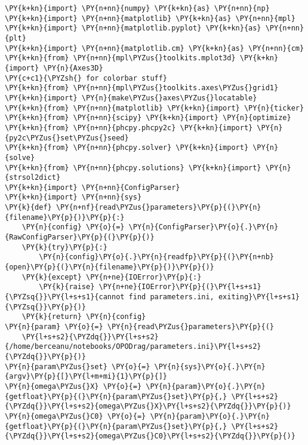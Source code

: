 
\begin{Verbatim}[commandchars=\\\{\}]
\PY{k+kn}{import} \PY{n+nn}{numpy} \PY{k+kn}{as} \PY{n+nn}{np}
\PY{k+kn}{import} \PY{n+nn}{matplotlib} \PY{k+kn}{as} \PY{n+nn}{mpl}
\PY{k+kn}{import} \PY{n+nn}{matplotlib.pyplot} \PY{k+kn}{as} \PY{n+nn}{plt}
\PY{k+kn}{import} \PY{n+nn}{matplotlib.cm} \PY{k+kn}{as} \PY{n+nn}{cm}
\PY{k+kn}{from} \PY{n+nn}{mpl\PYZus{}toolkits.mplot3d} \PY{k+kn}{import} \PY{n}{Axes3D}
\PY{c+c1}{\PYZsh{} for colorbar stuff}
\PY{k+kn}{from} \PY{n+nn}{mpl\PYZus{}toolkits.axes\PYZus{}grid1} \PY{k+kn}{import} \PY{n}{make\PYZus{}axes\PYZus{}locatable}
\PY{k+kn}{from} \PY{n+nn}{matplotlib} \PY{k+kn}{import} \PY{n}{ticker}
\PY{k+kn}{from} \PY{n+nn}{scipy} \PY{k+kn}{import} \PY{n}{optimize}
\PY{k+kn}{from} \PY{n+nn}{phcpy.phcpy2c} \PY{k+kn}{import} \PY{n}{py2c\PYZus{}set\PYZus{}seed}
\PY{k+kn}{from} \PY{n+nn}{phcpy.solver} \PY{k+kn}{import} \PY{n}{solve}
\PY{k+kn}{from} \PY{n+nn}{phcpy.solutions} \PY{k+kn}{import} \PY{n}{strsol2dict}
\PY{k+kn}{import} \PY{n+nn}{ConfigParser}
\PY{k+kn}{import} \PY{n+nn}{sys}
\PY{k}{def} \PY{n+nf}{read\PYZus{}parameters}\PY{p}{(}\PY{n}{filename}\PY{p}{)}\PY{p}{:}
    \PY{n}{config} \PY{o}{=} \PY{n}{ConfigParser}\PY{o}{.}\PY{n}{RawConfigParser}\PY{p}{(}\PY{p}{)}
    \PY{k}{try}\PY{p}{:}
        \PY{n}{config}\PY{o}{.}\PY{n}{readfp}\PY{p}{(}\PY{n+nb}{open}\PY{p}{(}\PY{n}{filename}\PY{p}{)}\PY{p}{)}
    \PY{k}{except} \PY{n+ne}{IOError}\PY{p}{:}
        \PY{k}{raise} \PY{n+ne}{IOError}\PY{p}{(}\PY{l+s+s1}{\PYZsq{}}\PY{l+s+s1}{cannot find parameters.ini, exiting}\PY{l+s+s1}{\PYZsq{}}\PY{p}{)}
    \PY{k}{return} \PY{n}{config}
\PY{n}{param} \PY{o}{=} \PY{n}{read\PYZus{}parameters}\PY{p}{(}
    \PY{l+s+s2}{\PYZdq{}}\PY{l+s+s2}{/home/berceanu/notebooks/OPODrag/parameters.ini}\PY{l+s+s2}{\PYZdq{}}\PY{p}{)}
\PY{n}{param\PYZus{}set} \PY{o}{=} \PY{n}{sys}\PY{o}{.}\PY{n}{argv}\PY{p}{[}\PY{l+m+mi}{1}\PY{p}{]}
\PY{n}{omega\PYZus{}X} \PY{o}{=} \PY{n}{param}\PY{o}{.}\PY{n}{getfloat}\PY{p}{(}\PY{n}{param\PYZus{}set}\PY{p}{,} \PY{l+s+s2}{\PYZdq{}}\PY{l+s+s2}{omega\PYZus{}X}\PY{l+s+s2}{\PYZdq{}}\PY{p}{)}
\PY{n}{omega\PYZus{}C0} \PY{o}{=} \PY{n}{param}\PY{o}{.}\PY{n}{getfloat}\PY{p}{(}\PY{n}{param\PYZus{}set}\PY{p}{,} \PY{l+s+s2}{\PYZdq{}}\PY{l+s+s2}{omega\PYZus{}C0}\PY{l+s+s2}{\PYZdq{}}\PY{p}{)}

\end{Verbatim}
